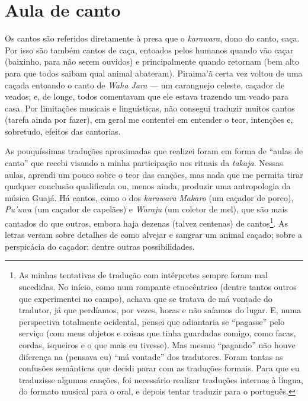 \section{Aula de canto}

Os cantos são referidos diretamente à presa que o \emph{karawara}, dono
do canto, caça. Por isso são também cantos de caça, entoados pelos
humanos quando vão caçar (baixinho, para não serem ouvidos) e
principalmente quando retornam (bem alto para que todos saibam qual
animal abateram). Piraima'ã certa vez voltou de uma caçada entoando o
canto de \emph{Waha Jara} --- um caranguejo celeste, caçador de veados; e,
de longe, todos comentavam que ele estava trazendo um veado para casa.
Por limitações musicais e linguísticas, não consegui traduzir muitos
cantos (tarefa ainda por fazer), em geral me contentei em entender o
teor, intenções e, sobretudo, efeitos das cantorias. 


As pouquíssimas traduções aproximadas que realizei foram em forma de
``aulas de canto'' que recebi visando a minha participação nos rituais da
\emph{takaja}. Nessas aulas, aprendi um pouco sobre o teor das canções,
mas nada que me permita tirar qualquer conclusão qualificada ou, menos
ainda, produzir uma antropologia da música Guajá. Há cantos, como o dos
\emph{karawara} \emph{Makaro} (um caçador de porco), \emph{Pu'uwa} (um
caçador de capelães) e \emph{Waraju} (um coletor de mel), que são mais
cantados do que outros, embora haja dezenas (talvez centenas) de
cantos\footnote{As minhas tentativas de tradução com intérpretes sempre
  foram mal sucedidas. No início, como num rompante etnocêntrico (dentre
  tantos outros que experimentei no campo), achava que se tratava de má
  vontade do tradutor, já que perdíamos, por vezes, horas e não saíamos
  do lugar. E, numa perspectiva totalmente ocidental, pensei que
  adiantaria se ``pagasse'' pelo serviço (com meus objetos e coisas que
  tinha guardadas comigo, como facas, cordas, isqueiros e o que mais eu
  tivesse). Mas mesmo ``pagando'' não houve diferença na (pensava eu) ``má
  vontade'' dos tradutores. Foram tantas as confusões semânticas que
  decidi parar com as traduções formais. Para que eu traduzisse algumas
  canções, foi necessário realizar traduções internas à língua, do
  formato musical para o oral, e depois tentar traduzir para o
  português.}. As letras versam sobre detalhes de como alvejar e sangrar
um animal caçado; sobre a perspicácia do caçador; dentre outras
possibilidades.

